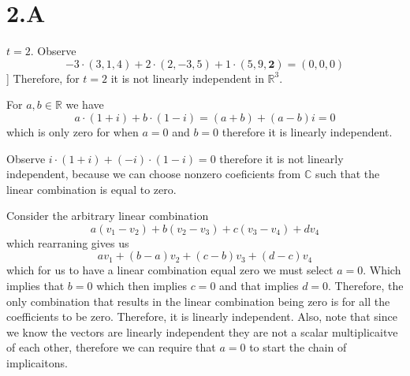 \documentclass[10pt, twocolumn]{article}
\newcommand{\C}{\mathbb{C}}
\newcommand{\R}{\mathbb{R}}
\begin{document}
\section*{2.A}
\begin{q}[Problem 3]
    $ t = 2 $. 
    Observe
    $$ -3 \cdot (3, 1, 4) + 2 \cdot (2, -3, 5) + 1 \cdot (5, 9, \textbf{2}) = (0, 0 , 0) $$]
    Therefore, for $ t = 2$ it is not linearly independent in $ \R ^3 $.
\end{q}
\begin{q}[Problem 5(a)]
    For $ a, b \in \R $ we have 
    $$ a \cdot ( 1+ i) + b \cdot (1 - i) = (a + b) + (a-b) i = 0 $$
    which is only zero for when $ a = 0 $ and $ b = 0 $ therefore it is linearly independent.
\end{q}
\begin{q}[Problem 5(b)]
    Observe
    $ i \cdot (1 + i)  + (-i) \cdot (1 -i) = 0 $
    therefore it is not linearly independent, 
    because we can choose nonzero coeficients from $ \C $ such that the linear combination is equal to zero.
\end{q}
\begin{q}[Problem 6]
    Consider the arbitrary linear combination 
    $$ a(v_1 - v_2) + b(v_2 - v_3) + c(v_3 - v_4) + d v_4 $$
    which rearraning gives us 
    $$ av_1 + (b-a)v_2 + (c-b)v_3 + (d-c) v_4 $$
    which for us to have a linear combination equal zero we must select $ a = 0$. 
    Which implies that $ b = 0$ which then implies $ c = 0 $ and that implies $ d = 0 $. 
    Therefore, the only combination that results in the linear combination being zero is for all the coefficients to be zero.
    Therefore, it is linearly independent. 
    Also, note that since we know the vectors are linearly independent they are not a scalar multiplicaitve of each other, therefore we can require that $ a = 0 $ to start the chain of implicaitons. 
\end{q}
\end{document}
